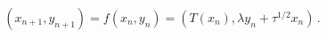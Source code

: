 \begin{equation}
(x_{n+1},y_{n+1}) = f(x_n,y_n) 
                  = (T(x_n),\lambda y_n + \tau^{1/2}x_n) \, .
\label{eq6}
\end{equation}

